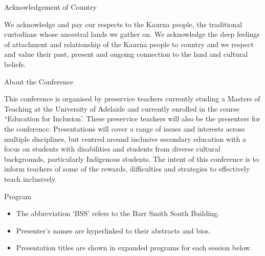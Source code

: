 \documentclass[twoside,12pt,a4paper,notitlepage]{memoir}
\newcounter{chapternonum}
\begin{document}
\pagestyle{plain}



\setcounter{tocdepth}{2}
\tableofcontents
\vfill

\clearpage{}
\vspace*{2cm}
{\Huge Acknowledgement of Country}
\vspace{2cm}

We acknowledge and pay our respects to the Kaurna people, the traditional custodians whose ancestral lands we gather on. We acknowledge the deep feelings of attachment and relationship of the Kaurna people to country and we respect and value their past, present and ongoing connection to the land and cultural beliefs.
\vfill

\clearpage{}
\vspace*{2cm}
{\Huge About the Conference}
\vspace{2cm}

This conference is organised by preservice teachers currently studing a Masters of Teaching at the University of Adelaide and currently enrolled in the course ``Education for Inclusion'. These preservice teachers will also be the presenters for the conference. Presentations will cover a range of issues and interests across multiple disciplines, but centred around inclusive secondary education with a focus on students with disabilities and students from diverse cultural backgrounds, particularly Indigenous students. The intent of this conference is to inform teachers of some of the rewards, difficulties and strategies to effectively teach inclusively. 
\vfill




%

\clearpage{}
\vspace*{2cm}
{\Huge Program}
\vspace{2cm}

\begin{itemize}
	\item The abbreviation `BSS' refers to the Barr Smith South Building.
	\item Presenter's names are hyperlinked to their abstracts and bios.
	\item Presentation titles are shown in expanded programs for each session below.
\end{itemize}
\end{document}
